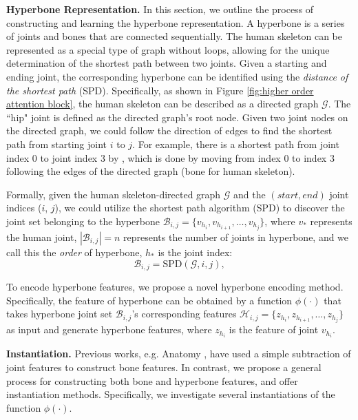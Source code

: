 \documentclass{article}
\begin{document}
\noindent \textbf{Hyperbone Representation.} In this section, we outline the process of constructing and learning the hyperbone representation. A hyperbone is a series of joints and bones that are connected sequentially. The human skeleton can be represented as a special type of graph without loops, allowing for the unique determination of the shortest path between two joints. Given a starting and ending joint, the corresponding hyperbone can be identified using the \textit{distance of the shortest path} (SPD). Specifically, as shown in Figure \ref{fig:higher order attention block}, the human skeleton can be described as a directed graph $\mathcal{G}$. The ``hip" joint is defined as the directed graph's root node. Given two joint nodes on the directed graph, we could follow the direction of edges to find the shortest path from starting joint $i$ to $j$. For example, there is a shortest path from joint index 0 to joint index 3 by \text{[0, 1, 2, 3]}, which is done by moving from index 0 to index 3 following the edges of the directed graph (bone for human skeleton). 


Formally, given the human skeleton-directed graph $\mathcal{G}$ and the $(start,end)$ joint indices ($i$, $j$), we could utilize the shortest path algorithm (SPD) to discover the joint set belonging to the hyperbone $\mathcal{B}_{i,j}=\{v_{h_i},v_{h_{i+1}},\dots,v_{h_j} \}$, where $v_{*}$ represents the human joint, $|\mathcal{B}_{i,j}| = n$ represents the number of joints in hyperbone, and we call this the \textit{order} of hyperbone, $h_{*}$ is the joint index:
\begin{equation}
    \mathcal{B}_{i,j} = \text{SPD}(\mathcal{G}, i, j),
\end{equation}

To encode hyperbone features, we propose a novel hyperbone encoding method. Specifically, the feature of hyperbone can be obtained by a function $\phi(\cdot)$ that takes hyperbone joint set $\mathcal{B}_{i,j}$'s corresponding features $\mathcal{H}_{i,j} = \{ z_{h_i}, z_{h_{i+1}},\dots,z_{h_j}\}$ as input and generate hyperbone features, where $z_{h_i}$ is the feature of joint $v_{h_i}$.


\noindent \textbf{Instantiation.} Previous works, e.g. Anatomy \cite{chen(2021)-anatomyaware}, have used a simple subtraction of joint features to construct bone features. In contrast, we propose a general process for constructing both bone and hyperbone features, and offer instantiation methods. Specifically, we investigate several instantiations of the function $\phi(\cdot)$.
\end{document}
